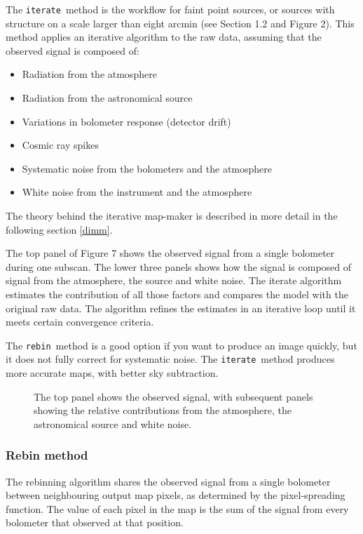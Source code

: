 \documentclass[twoside,11pt]{article}
\newcommand{\xlabel}[1]{}
\renewcommand{\_}{\texttt{\symbol{95}}}
\newcommand{\rebin}{\texttt{rebin}}
\newcommand{\iterate}{\texttt{iterate}}
\begin{document}
The \iterate\ method is the workflow for faint point sources, or
sources with structure on a scale larger than eight arcmin (see
Section 1.2 and Figure 2). This method applies an iterative algorithm
to the raw data, assuming that the observed signal is composed of:
\begin{itemize}
\item Radiation from the atmosphere
\item Radiation from the astronomical source
\item Variations in bolometer response (detector drift)
\item Cosmic ray spikes
\item Systematic noise from the bolometers and the atmosphere
\item White noise from the instrument and the atmosphere
\end{itemize}
The theory behind the iterative map-maker is described in more detail
in the following section \ref{dimm}.

The top panel of Figure 7 shows the observed signal from a single
bolometer during one subscan. The lower three panels shows how the
signal is composed of signal from the atmosphere, the source and white
noise. The iterate algorithm estimates the contribution of all those
factors and compares the model with the original raw data. The
algorithm refines the estimates in an iterative loop until it meets
certain convergence criteria.

The \rebin\ method is a good option if you want to produce an image
quickly, but it does not fully correct for systematic noise. The
\iterate\ method produces more accurate maps, with better sky
subtraction.

\begin{figure}
\caption{The top panel shows the observed signal, with subsequent
  panels showing the relative contributions from the atmosphere, the
  astronomical source and white noise.}
\end{figure}

\subsubsection{\xlabel{rebin}Rebin method\label{se:rebin}}

The rebinning algorithm shares the observed signal from a single
bolometer between neighbouring output map pixels, as determined by the
pixel-spreading function. The value of each pixel in the map is the
sum of the signal from every bolometer that observed at that position.
\end{document}
